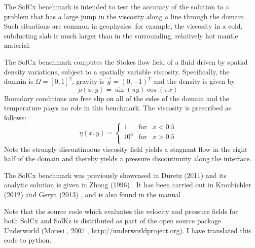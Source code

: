 
The SolCx benchmark is intended to test the accuracy of the solution to a problem that 
has a large jump in the viscosity along a line through the domain. Such situations are 
common in geophysics: for example, the viscosity in a cold, subducting slab is much larger 
than in the surrounding, relatively hot mantle material.

The SolCx benchmark computes the Stokes flow field of a fluid driven by spatial density 
variations, subject to a spatially variable viscosity. Specifically, the domain 
is $\Omega = [0,1]^2$, gravity is $\vec{g} = (0,-1)^T$ and the density is given by 
\begin{equation}
\rho(x,y) = \sin(\pi y) \cos(\pi x)
\end{equation}
Boundary conditions are free slip on all of the sides of the domain and the 
temperature plays no role in this benchmark. 
The viscosity is prescribed as follows:
\begin{equation}
\eta(x,y) = 
\left\{
\begin{array}{lll}
1 & \text{for} & x<0.5 \\
10^6 & \text{for} & x>0.5 \\
\end{array}
\right.
\end{equation}
Note the strongly discontinuous viscosity field yields a stagnant flow 
in the right half of the domain and thereby yields a pressure discontinuity along the interface. 

The SolCx benchmark was previously showcased in Duretz \etal (2011) \cite{dumg11} 
and its analytic solution is given in Zhong (1996) \cite{zhon96}. 
It has been carried out in Kronbichler \etal (2012) \cite{krhb12} and Gerya \etal (2013) \cite{gemd13}, 
and is also found in the \aspect manual \cite{aspectmanual}. 

Note that the source code which evaluates the velocity and pressure fields for both SolCx and SolKz is 
distributed as part of the open source package Underworld 
(Moresi \etal, 2007 \cite{moql07}, http://underworldproject.org).
I have translated this code to python. 

